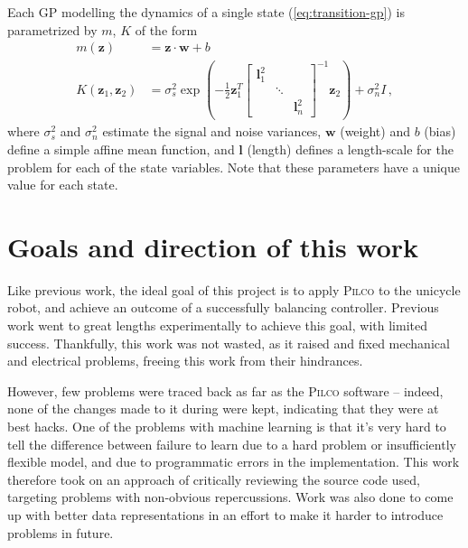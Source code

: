 \documentclass[main.tex]{subfiles}
\begin{document}
		Each GP modelling the dynamics of a single state (\cref{eq:transition-gp}) is parametrized by $m$, $K$ of the form
		\begin{align}
			m(\bm{z}) &= \bm{z} \cdot \bm{w} + b \\
			K(\bm{z}_1, \bm{z}_2) &= \sigma_s^2 \exp \left(
				-\frac{1}{2}
				\bm{z}_1^T
				\begin{bmatrix}
					\bm{l}_1^2 && \\
					& \ddots & \\
					&& \bm{l}_n^2
				\end{bmatrix}^{-1}
				\bm{z}_2
			\right) + \sigma_n^2 I \,,
		\end{align}
		where $\sigma_s^2$ and $\sigma_n^2$ estimate the signal and noise variances, $\bm{w}$ (weight) and $b$ (bias) define a simple affine mean function, and $\bm{l}$ (length) defines a length-scale for the problem for each of the state variables.
		Note that these parameters have a unique value for each state.

\section{Goals and direction of this work}

	Like previous work, the ideal goal of this project is to apply \textsc{Pilco} to the unicycle robot, and achieve an outcome of a successfully balancing controller.
	Previous work went to great lengths experimentally to achieve this goal, with limited success. Thankfully, this work was not wasted, as it raised and fixed mechanical and electrical problems, freeing this work from their hindrances.

	However, few problems were traced back as far as the \textsc{Pilco} software -- indeed, none of the changes made to it during \cite{aleksi} were kept, indicating that they were at best hacks.
	One of the problems with machine learning is that it's very hard to tell the difference between failure to learn due to a hard problem or insufficiently flexible model, and due to programmatic errors in the implementation.
	This work therefore took on an approach of critically reviewing the source code used, targeting problems with non-obvious repercussions.
	Work was also done to come up with better data representations in an effort to make it harder to introduce problems in future.



\bib
\end{document}
